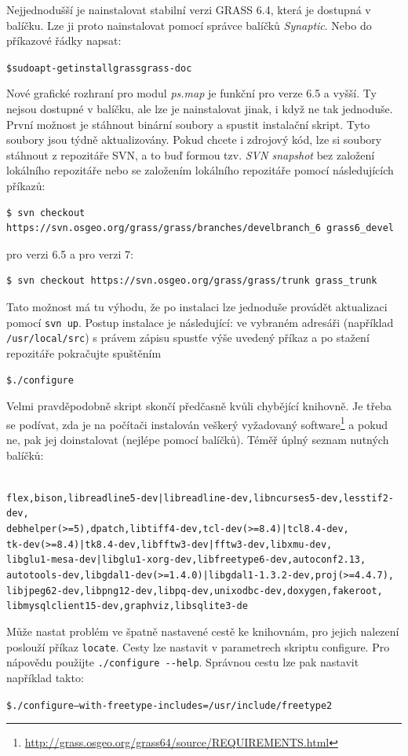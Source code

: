 \documentclass[a4paper,12pt,draft]{article}
\newcommand{\modul}[1]{\emph{#1}}
\begin{document}
Nejjednodušší je nainstalovat stabilní verzi GRASS 6.4, která je
dostupná v balíčku. Lze ji proto nainstalovat pomocí správce balíčků
\emph{Synaptic}. Nebo do příkazové řádky napsat:
\begin{alltt}
{\footnotesize \$ sudo apt-get install grass grass-doc}
\end{alltt}

Nové grafické rozhraní pro modul \modul{ps.map} je funkční pro verze 6.5
a vyšší. Ty nejsou dostupné v balíčku, ale lze je nainstalovat jinak,
i když ne tak jednoduše. První možnost je stáhnout binární soubory  a
spustit instalační skript. Tyto soubory jsou týdně aktualizovány. Pokud
chcete i zdrojový kód, lze si soubory stáhnout z repozitáře SVN, a to buď
formou tzv. \emph{SVN snapshot} bez založení lokálního repozitáře nebo
se založením lokálního repozitáře pomocí následujících příkazů:
\begin{footnotesize}
\begin{verbatim}
$ svn checkout https://svn.osgeo.org/grass/grass/branches/develbranch_6 grass6_devel
\end{verbatim}
\end{footnotesize}
pro verzi 6.5 a pro verzi 7:
\begin{footnotesize}
\begin{verbatim}
$ svn checkout https://svn.osgeo.org/grass/grass/trunk grass_trunk
\end{verbatim}
\end{footnotesize}
Tato možnost má tu výhodu, že po instalaci lze jednoduše provádět
aktualizaci pomocí \verb|svn up|. Postup instalace je následující: ve
vybraném adresáři (například \verb|/usr/local/src|) s právem zápisu
spustťe výše uvedený příkaz a po stažení repozitáře pokračujte
spuštěním
\begin{alltt}
{\footnotesize \$ ./configure}
\end{alltt}
Velmi pravděpodobně skript skončí předčasně
kvůli chybějící knihovně. Je třeba se podívat,
zda je na počítači instalován veškerý vyžadovaný
software\footnote{\url{http://grass.osgeo.org/grass64/source/REQUIREMENTS.html}}
a pokud ne, pak jej doinstalovat (nejlépe pomocí balíčků). Téměř
úplný seznam nutných balíčků:
\begin{alltt}
{\footnotesize
flex, bison, libreadline5-dev | libreadline-dev, libncurses5-dev, lesstif2-dev,
debhelper (>= 5), dpatch, libtiff4-dev, tcl-dev (>= 8.4) | tcl8.4-dev,
tk-dev (>= 8.4) | tk8.4-dev, libfftw3-dev|fftw3-dev, libxmu-dev,
libglu1-mesa-dev | libglu1-xorg-dev, libfreetype6-dev, autoconf2.13,
autotools-dev, libgdal1-dev (>=1.4.0) | libgdal1-1.3.2-dev, proj (>= 4.4.7),
libjpeg62-dev, libpng12-dev, libpq-dev, unixodbc-dev, doxygen, fakeroot,
libmysqlclient15-dev, graphviz, libsqlite3-de
}
\end{alltt}
Může nastat problém ve špatně nastavené cestě ke knihovnám, pro
jejich nalezení poslouží příkaz \verb|locate|. Cesty lze nastavit v
parametrech skriptu configure.
Pro nápovědu použijte \verb|./configure --help|.
Správnou cestu lze pak nastavit například takto:
\begin{alltt}
{\footnotesize \$ ./configure --with-freetype-includes=/usr/include/freetype2
}
\end{alltt}
\end{document}
